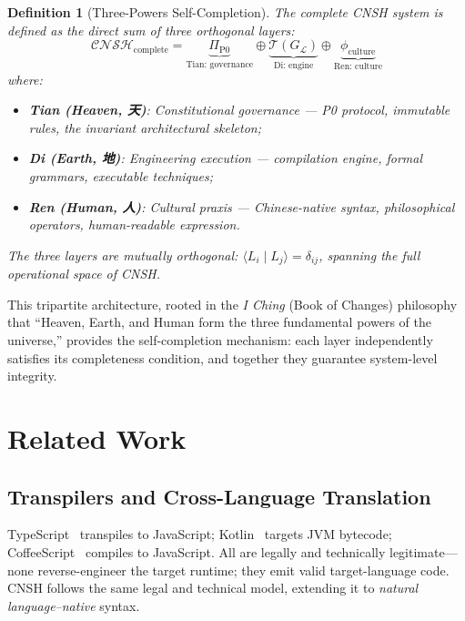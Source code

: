 \documentclass[conference]{IEEEtran}
\newtheorem{definition}{Definition}
\begin{document}
\begin{definition}[Three-Powers Self-Completion]
  The complete CNSH system is defined as the direct sum of three
  orthogonal layers:
  \begin{equation}
    \mathcal{CNSH}_{\text{complete}} =
    \underbrace{\Pi_{\text{P0}}}_{\text{Tian: governance}}
    \oplus
    \underbrace{\mathcal{T}(G_{\mathcal{L}})}_{\text{Di: engine}}
    \oplus
    \underbrace{\phi_{\text{culture}}}_{\text{Ren: culture}}
    \label{eq:sancai}
  \end{equation}
  where:
  \begin{itemize}
    \item \textbf{Tian (Heaven, 天)}: Constitutional governance ---
      P0 protocol, immutable rules, the invariant architectural skeleton;
    \item \textbf{Di (Earth, 地)}: Engineering execution ---
      compilation engine, formal grammars, executable techniques;
    \item \textbf{Ren (Human, 人)}: Cultural praxis ---
      Chinese-native syntax, philosophical operators,
      human-readable expression.
  \end{itemize}
  The three layers are mutually orthogonal:
  $\langle L_i \mid L_j \rangle = \delta_{ij}$,
  spanning the full operational space of CNSH.
\end{definition}

This tripartite architecture, rooted in the \emph{I Ching}
(Book of Changes) philosophy that ``Heaven, Earth, and Human
form the three fundamental powers of the universe,''
provides the self-completion mechanism: each layer independently
satisfies its completeness condition, and together they guarantee
system-level integrity.

\section{Related Work}

\subsection{Transpilers and Cross-Language Translation}
TypeScript~\cite{TypeScript2012} transpiles to JavaScript;
Kotlin~\cite{Kotlin2011} targets JVM bytecode;
CoffeeScript~\cite{CoffeeScript2009} compiles to JavaScript.
All are legally and technically legitimate---none reverse-engineer
the target runtime; they emit valid target-language code.
CNSH follows the same legal and technical model, extending it
to \emph{natural language--native} syntax.
\end{document}
